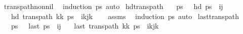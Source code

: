 \begin{isabellebody}
\ trans{\isacharunderscore}{\kern0pt}path{\isacharunderscore}{\kern0pt}non{\isacharunderscore}{\kern0pt}nil\ \isamarkupfalse%
\ {\isacharparenleft}{\kern0pt}induction\ ps{\isacharparenright}{\kern0pt}\ auto%
\endisatagproof
{\isafoldproof}%
%
\isadelimproof
\isanewline
%
\endisadelimproof
\isanewline
{}\isamarkupfalse%
\ hd{\isacharunderscore}{\kern0pt}trans{\isacharunderscore}{\kern0pt}path{\isacharcolon}{\kern0pt}\isanewline
\ \ \ {\isachardoublequoteopen}ps\ {\isasymnoteq}\ {\isacharbrackleft}{\kern0pt}{\isacharbrackright}{\kern0pt}{\isachardoublequoteclose}\ {\isachardoublequoteopen}hd\ ps\ {\isacharequal}{\kern0pt}\ {\isacharparenleft}{\kern0pt}i{\isacharcomma}{\kern0pt}j{\isacharparenright}{\kern0pt}{\isachardoublequoteclose}\isanewline
\ \ \ {\isachardoublequoteopen}hd\ {\isacharparenleft}{\kern0pt}trans{\isacharunderscore}{\kern0pt}path\ {\isacharparenleft}{\kern0pt}kk\ ps{\isacharparenright}{\kern0pt}\ {\isacharequal}{\kern0pt}\ {\isacharparenleft}{\kern0pt}i{\isacharplus}{\kern0pt}kj{\isacharplus}{\kern0pt}k\isanewline
%
\isadelimproof
\ \ %
\endisadelimproof
%
\isatagproof
{}\isamarkupfalse%
\ assms\ \isamarkupfalse%
\ {\isacharparenleft}{\kern0pt}induction\ ps{\isacharparenright}{\kern0pt}\ auto%
\endisatagproof
{\isafoldproof}%
%
\isadelimproof
\isanewline
%
\endisadelimproof
\isanewline
{}\isamarkupfalse%
\ last{\isacharunderscore}{\kern0pt}trans{\isacharunderscore}{\kern0pt}path{\isacharcolon}{\kern0pt}\isanewline
\ \ \ {\isachardoublequoteopen}ps\ {\isasymnoteq}\ {\isacharbrackleft}{\kern0pt}{\isacharbrackright}{\kern0pt}{\isachardoublequoteclose}\ {\isachardoublequoteopen}last\ ps\ {\isacharequal}{\kern0pt}\ {\isacharparenleft}{\kern0pt}i{\isacharcomma}{\kern0pt}j{\isacharparenright}{\kern0pt}{\isachardoublequoteclose}\isanewline
\ \ \ {\isachardoublequoteopen}last\ {\isacharparenleft}{\kern0pt}trans{\isacharunderscore}{\kern0pt}path\ {\isacharparenleft}{\kern0pt}kk\ ps{\isacharparenright}{\kern0pt}\ {\isacharequal}{\kern0pt}\ {\isacharparenleft}{\kern0pt}i{\isacharplus}{\kern0pt}kj{\isacharplus}{\kern0pt}k\isanewline

\end{isabellebody}
